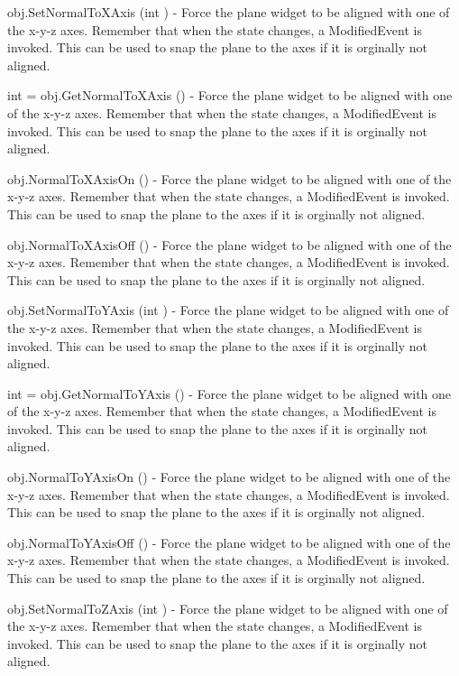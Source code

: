 \begin{DoxyItemize}
\item {\ttfamily obj.\-Set\-Normal\-To\-X\-Axis (int )} -\/ Force the plane widget to be aligned with one of the x-\/y-\/z axes. Remember that when the state changes, a Modified\-Event is invoked. This can be used to snap the plane to the axes if it is orginally not aligned.  
\item {\ttfamily int = obj.\-Get\-Normal\-To\-X\-Axis ()} -\/ Force the plane widget to be aligned with one of the x-\/y-\/z axes. Remember that when the state changes, a Modified\-Event is invoked. This can be used to snap the plane to the axes if it is orginally not aligned.  
\item {\ttfamily obj.\-Normal\-To\-X\-Axis\-On ()} -\/ Force the plane widget to be aligned with one of the x-\/y-\/z axes. Remember that when the state changes, a Modified\-Event is invoked. This can be used to snap the plane to the axes if it is orginally not aligned.  
\item {\ttfamily obj.\-Normal\-To\-X\-Axis\-Off ()} -\/ Force the plane widget to be aligned with one of the x-\/y-\/z axes. Remember that when the state changes, a Modified\-Event is invoked. This can be used to snap the plane to the axes if it is orginally not aligned.  
\item {\ttfamily obj.\-Set\-Normal\-To\-Y\-Axis (int )} -\/ Force the plane widget to be aligned with one of the x-\/y-\/z axes. Remember that when the state changes, a Modified\-Event is invoked. This can be used to snap the plane to the axes if it is orginally not aligned.  
\item {\ttfamily int = obj.\-Get\-Normal\-To\-Y\-Axis ()} -\/ Force the plane widget to be aligned with one of the x-\/y-\/z axes. Remember that when the state changes, a Modified\-Event is invoked. This can be used to snap the plane to the axes if it is orginally not aligned.  
\item {\ttfamily obj.\-Normal\-To\-Y\-Axis\-On ()} -\/ Force the plane widget to be aligned with one of the x-\/y-\/z axes. Remember that when the state changes, a Modified\-Event is invoked. This can be used to snap the plane to the axes if it is orginally not aligned.  
\item {\ttfamily obj.\-Normal\-To\-Y\-Axis\-Off ()} -\/ Force the plane widget to be aligned with one of the x-\/y-\/z axes. Remember that when the state changes, a Modified\-Event is invoked. This can be used to snap the plane to the axes if it is orginally not aligned.  
\item {\ttfamily obj.\-Set\-Normal\-To\-Z\-Axis (int )} -\/ Force the plane widget to be aligned with one of the x-\/y-\/z axes. Remember that when the state changes, a Modified\-Event is invoked. This can be used to snap the plane to the axes if it is orginally not aligned.  

\end{DoxyItemize}
